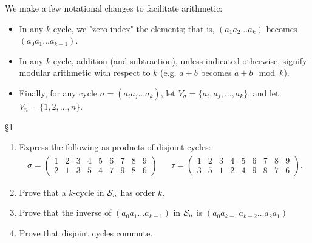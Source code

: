 \documentclass{homework}
\begin{document}
We make a few notational changes to facilitate arithmetic:
\begin{itemize}
  \item In any $k$-cycle, we "zero-index" the elements; that is, $(a_1a_2\ldots a_k)$ becomes
    $(a_0a_1\ldots a_{k-1})$.
  \item In any $k$-cycle, addition (and subtraction), unless indicated otherwise, signify modular
    arithmetic with respect to $k$ (e.g. $a\pm b$ becomes $a\pm b\mod{k}$).
  \item Finally, for any cycle $ \sigma=(a_ia_j\ldots a_k)$, let $V_\sigma=\{ a_i,a_j,\ldots,a_k
    \}$, and let $V_n=\{ 1,2,\ldots,n \}$.
\end{itemize}

\begin{problem}{\S 1}
  \begin{enumerate}[label=(\alph*)]
    \item Express the following as products of disjoint cycles:
      \begin{align*}
        \sigma=\begin{pmatrix} 1&2&3&4&5&6&7&8&9\\2&1&3&5&4&7&9&8&6 \end{pmatrix}
                                &&\tau=\begin{pmatrix} 1&2&3&4&5&6&7&8&9\\3&5&1&2&4&9&8&7&6 \end{pmatrix} 
      .\end{align*}
    \item Prove that a $k$-cycle in $ \mathcal{S}_n$ has order $k$.
    \item Prove that the inverse of $(a_0a_1\ldots a_{k-1})$ in $\mathcal{S}_n$ is
      $(a_0a_{k-1}a_{k-2}\ldots a_2a_1)$
    \item Prove that disjoint cycles commute.
  \end{enumerate}
\end{problem}
\end{document}
